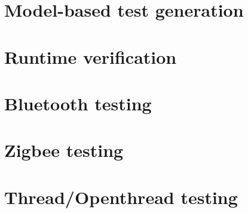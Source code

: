 \section{Model-based test generation}

\section{Runtime verification}

\section{Bluetooth testing}

\section{Zigbee testing}

\section{Thread/Openthread testing}
